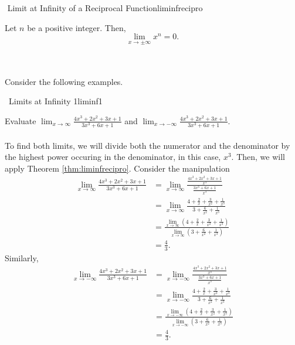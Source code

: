         \begin{theorem}{\Stop\,\,Limit at Infinity of a Reciprocal Function}{liminfrecipro}

            Let \(n\) be a positive integer. Then,
            \begin{equation*}
                \lim_{x\to\pm\infty}x^n=0.
            \end{equation*}
            
        \end{theorem}
        \vphantom
        \\
        \\
        Consider the following examples.
        \begin{example}{\Difficulty\,\Difficulty\,\,Limits at Infinity 1}{liminf1}

            Evaluate \(\lim_{x\to\infty}\frac{4x^3+2x^2+3x+1}{3x^3+6x+1}\) and \(\lim_{x\to-\infty}\frac{4x^3+2x^2+3x+1}{3x^3+6x+1}\).
            \\
            \\
            To find both limits, we will divide both the numerator and the denominator by the highest power occuring in the denominator, in this case, \(x^3\). Then, we will apply Theorem \ref{thm:liminfrecipro}. Consider the manipulation
            \begin{align*}
                \lim_{x\to\infty}\frac{4x^3+2x^2+3x+1}{3x^3+6x+1}&=\lim_{x\to\infty}\frac{\frac{4x^3+2x^2+3x+1}{x^3}}{\frac{3x^3+6x+1}{x^3}} \\
                &=\lim_{x\to\infty}\frac{4+\frac{2}{x}+\frac{3}{x^2}+\frac{1}{x^3}}{3+\frac{6}{x^2}+\frac{1}{x^3}} \\
                &=\frac{\lim\limits_{x\to\infty}\left(4+\frac{2}{x}+\frac{3}{x^2}+\frac{1}{x^3}\right)}{\lim\limits_{x\to\infty}\left(3+\frac{6}{x^2}+\frac{1}{x^3}\right)} \\
                &=\frac{4}{3}.
            \end{align*}
            Similarly,
            \begin{align*}
                \lim_{x\to-\infty}\frac{4x^3+2x^2+3x+1}{3x^3+6x+1}&=\lim_{x\to-\infty}\frac{\frac{4x^3+2x^2+3x+1}{x^3}}{\frac{3x^3+6x+1}{x^3}} \\
                &=\lim_{x\to-\infty}\frac{4+\frac{2}{x}+\frac{3}{x^2}+\frac{1}{x^3}}{3+\frac{6}{x^2}+\frac{1}{x^3}} \\
                &=\frac{\lim\limits_{x\to-\infty}\left(4+\frac{2}{x}+\frac{3}{x^2}+\frac{1}{x^3}\right)}{\lim\limits_{x\to-\infty}\left(3+\frac{6}{x^2}+\frac{1}{x^3}\right)} \\
                &=\frac{4}{3}.
            \end{align*}
        \end{example}
